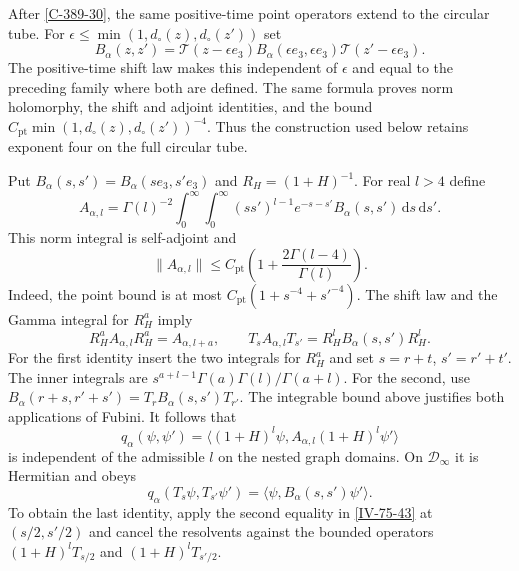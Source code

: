 \documentclass[11pt,letterpaper,reqno]{amsart}
\theoremstyle{definition}
\theoremstyle{remark}
\begin{document}
After \cref{C-389-30}, the same positive-time point
operators extend to the circular tube. For
$\epsilon\le\min(1,d_\circ(z),d_\circ(z'))$ set
\[
 B_\alpha(z,z')=\mathcal T(z-\epsilon e_3)
         B_\alpha(\epsilon e_3,\epsilon e_3)
                                  \mathcal T(z'-\epsilon e_3).
\]
The positive-time shift law makes this independent of
$\epsilon$ and equal to the preceding family where both
are defined. The same formula proves norm holomorphy,
the shift and adjoint identities, and the bound
$C_{\mathrm{pt}}\min(1,d_\circ(z),d_\circ(z'))^{-4}$.
Thus the construction used below retains exponent four
on the full circular tube.

Put $B_\alpha(s,s')=B_\alpha(se_3,s'e_3)$ and
$R_H=(1+H)^{-1}$. For real $l>4$ define
\begin{equation}\label{IV-75-40}
 A_{\alpha,l}=\Gamma(l)^{-2}\int_0^\infty\!\int_0^\infty
       (ss')^{l-1}e^{-s-s'}B_\alpha(s,s')\,\mathrm{d}s\,\mathrm{d}s'.
\end{equation}
This norm integral is self-adjoint and
\begin{equation}\label{IV-75-42}
 \|A_{\alpha,l}\|\le
       C_{\mathrm{pt}}\left(1+\frac{2\Gamma(l-4)}{\Gamma(l)}\right).
\end{equation}
Indeed, the point bound is at most
$C_{\mathrm{pt}}(1+s^{-4}+s'^{-4})$.
The shift law and the Gamma integral for $R_H^a$ imply
\begin{equation}\label{IV-75-43}
 R_H^a A_{\alpha,l}R_H^a=A_{\alpha,l+a},\qquad
 T_sA_{\alpha,l}T_{s'}=R_H^lB_\alpha(s,s')R_H^l.
\end{equation}
For the first identity insert the two integrals for $R_H^a$
and set $s=r+t$, $s'=r'+t'$. The inner integrals are
$s^{a+l-1}\Gamma(a)\Gamma(l)/\Gamma(a+l)$.
For the second, use
$B_\alpha(r+s,r'+s')=T_rB_\alpha(s,s')T_{r'}$.
The integrable bound above justifies both applications of Fubini.
It follows that
\begin{equation}\label{IV-75-49}
 q_\alpha(\psi,\psi')=
 \langle(1+H)^l\psi,A_{\alpha,l}(1+H)^l\psi'\rangle
\end{equation}
is independent of the admissible $l$ on the nested graph
domains. On $\mathcal D_\infty$ it is Hermitian and obeys
\begin{equation}\label{IV-75-45}
 q_\alpha(T_s\psi,T_{s'}\psi')
                     =\langle\psi,B_\alpha(s,s')\psi'\rangle.
\end{equation}
To obtain the last identity, apply the second equality in
\eqref{IV-75-43} at $(s/2,s'/2)$ and cancel the resolvents
against the bounded operators $(1+H)^lT_{s/2}$ and
$(1+H)^lT_{s'/2}$.
\end{document}
